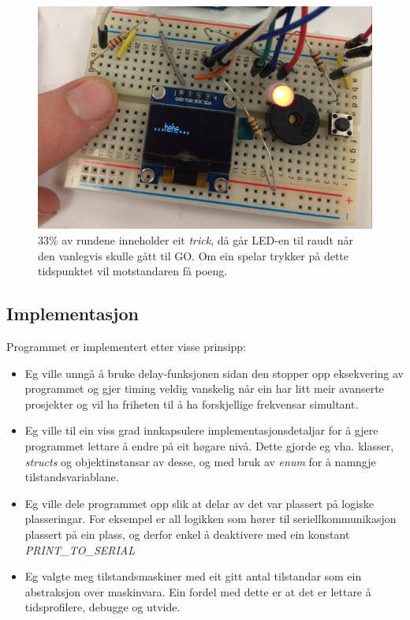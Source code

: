 \documentclass[journal]{IEEEtran}
\begin{document}
  \begin{figure}[!h]
    \begin{center}
      \includegraphics[scale=0.2]{03_trick}
      \caption{$33\%$ av rundene inneholder eit \textit{trick}, då går LED-en til
      raudt når den vanlegvis skulle gått til GO. Om ein spelar trykker på dette
      tidspunktet vil motstandaren få poeng.}
    \end{center}
  \end{figure}

  \subsection{Implementasjon}
  Programmet er implementert etter visse prinsipp:
  \begin{itemize}
    \item Eg ville unngå å bruke delay-funksjonen sidan den stopper opp eksekvering
      av programmet og gjer timing veldig vanskelig når ein har litt meir avanserte
      prosjekter og vil ha friheten til å ha forskjellige frekvensar simultant.
    \item Eg ville til ein viss grad innkapsulere implementasjonsdetaljar for å 
      gjere programmet lettare å endre på eit høgare nivå. Dette gjorde eg
      vha. klasser, \textit{structs} og objektinstansar av desse, og med bruk av \textit{enum} for å
      namngje tilstandsvariablane.
    \item Eg ville dele programmet opp slik at delar av det var plassert på
      logiske plasseringar. For eksempel er all logikken som hører til
      seriellkommunikasjon plassert på ein plass, og derfor enkel å deaktivere
      med ein konstant \textit{PRINT\_TO\_SERIAL}
    \item Eg valgte meg tilstandsmaskiner med eit gitt antal tilstandar som ein
      abstraksjon over maskinvara. Ein fordel med dette er at det er lettare
      å tidsprofilere, debugge og utvide.
  \end{itemize}
\end{document}
